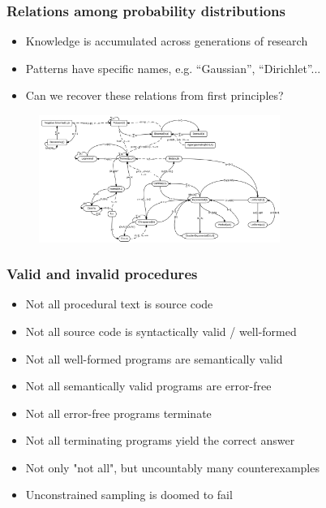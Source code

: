 \documentclass{beamer}
\begin{document}
    \begin{frame}
        \frametitle{Relations among probability distributions}
        \begin{itemize}
            \item Knowledge is accumulated across generations of research
            \item Patterns have specific names, e.g. ``Gaussian'', ``Dirichlet''...
            \item Can we recover these relations from first principles?
        \end{itemize}
        \begin{figure}[H]
            \centering
            \includegraphics[width=0.7\textwidth]{../clipart/distribution_relations.jpeg}
        \end{figure}
    \end{frame}

    \begin{frame}
        \frametitle{Valid and invalid procedures}
        \begin{itemize}
            \item Not all procedural text is source code
            \item Not all source code is syntactically valid / well-formed
            \item Not all well-formed programs are semantically valid
            \item Not all semantically valid programs are error-free
            \item Not all error-free programs terminate
            \item Not all terminating programs yield the correct answer
            \item Not only "not all", but uncountably many counterexamples
            \item Unconstrained sampling is doomed to fail
        \end{itemize}
    \end{frame}
\end{document}

